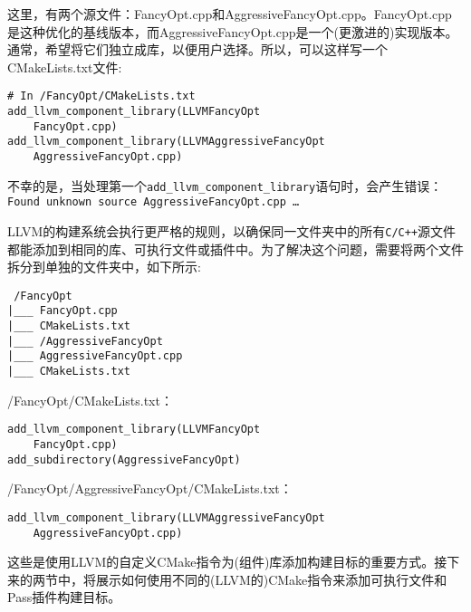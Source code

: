这里，有两个源文件：FancyOpt.cpp和AggressiveFancyOpt.cpp。FancyOpt.cpp是这种优化的基线版本，而AggressiveFancyOpt.cpp是一个(更激进的)实现版本。通常，希望将它们独立成库，以便用户选择。所以，可以这样写一个CMakeLists.txt文件:

\begin{lstlisting}[style=styleCMake]
# In /FancyOpt/CMakeLists.txt
add_llvm_component_library(LLVMFancyOpt
	FancyOpt.cpp)
add_llvm_component_library(LLVMAggressiveFancyOpt
	AggressiveFancyOpt.cpp)
\end{lstlisting}

不幸的是，当处理第一个\texttt{add\_llvm\_component\_library}语句时，会产生错误：\texttt{Found unknown source AggressiveFancyOpt.cpp …}

LLVM的构建系统会执行更严格的规则，以确保同一文件夹中的所有\texttt{C/C++}源文件都能添加到相同的库、可执行文件或插件中。为了解决这个问题，需要将两个文件拆分到单独的文件夹中，如下所示:

\begin{tcolorbox}[colback=white,colframe=black]
\tt
/FancyOpt \\
\hspace*{0.5cm}|\_\_\_ FancyOpt.cpp \\
\hspace*{0.5cm}|\_\_\_ CMakeLists.txt \\
\hspace*{0.5cm}|\_\_\_ /AggressiveFancyOpt \\
\hspace*{1cm}|\_\_\_ AggressiveFancyOpt.cpp \\
\hspace*{1cm}|\_\_\_ CMakeLists.txt
\end{tcolorbox}

/FancyOpt/CMakeLists.txt：

\begin{lstlisting}[style=styleCMake]
add_llvm_component_library(LLVMFancyOpt
	FancyOpt.cpp)
add_subdirectory(AggressiveFancyOpt)
\end{lstlisting}

/FancyOpt/AggressiveFancyOpt/CMakeLists.txt：

\begin{lstlisting}[style=styleCMake]
add_llvm_component_library(LLVMAggressiveFancyOpt
	AggressiveFancyOpt.cpp)
\end{lstlisting}

这些是使用LLVM的自定义CMake指令为(组件)库添加构建目标的重要方式。接下来的两节中，将展示如何使用不同的(LLVM的)CMake指令来添加可执行文件和Pass插件构建目标。

